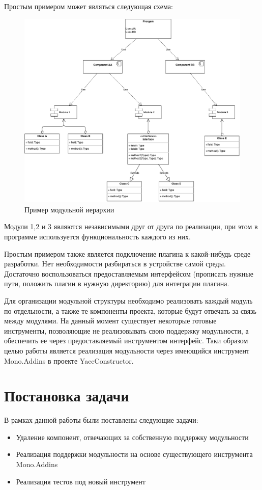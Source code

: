 Простым примером может являться следующая схема:

\begin{figure}[h!]
\begin{center}
\includegraphics[width=\linewidth]{Orlov/module_example}
\caption{Пример модульной иерархии}
\label{fig:module_example} 
\end{center}
\end{figure}

Модули 1,2 и 3 являются независимыми друг от друга по реализации, при этом в программе используется функциональность каждого из них.

Простым примером также является подключение плагина к какой-нибудь среде разработки. Нет необходимости разбираться в устройстве самой среды. Достаточно воспользоваться предоставляемым интерфейсом (прописать нужные пути, положить плагин в нужную директорию) для интеграции плагина.

Для организации модульной структуры необходимо реализовать каждый модуль по отдельности, а также те компоненты проекта, которые будут отвечать за связь между модулями. На данный момент существует некоторые готовые инструменты, позволяющие не реализовывать свою поддержку модульности, а обеспечить ее через предоставляемый инструментом интерфейс.
Таки образом целью работы является реализация модульности через имеющийся инструмент Mono.Addins в проекте YaccConstructor.

\section{Постановка задачи}
В рамках данной работы были поставлены следующие задачи:
\begin{itemize}
\item Удаление компонент, отвечающих за собственную поддержку модульности
\item Реализация поддержки модульности на основе существующего инструмента Mono.Addins
\item Реализация тестов под новый инструмент
\end{itemize}

